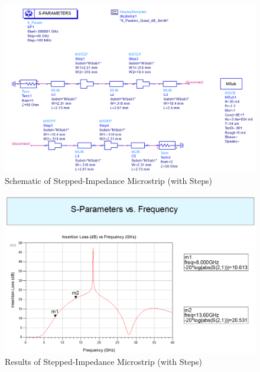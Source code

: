     \begin{figure}[H]
        \centering
        \includegraphics[width=0.8\linewidth]{img/Problem1/MicrostripSteppedImpedanceWithStepsSchematic.PNG}
        \caption{Schematic of Stepped-Impedance Microstrip (with Steps)}
        \label{fig:img/Problem1/MicrostripSteppedImpedanceWithStepsSchematic}
    \end{figure}

    \begin{figure}[H]
        \centering
        \includegraphics[width=0.8\linewidth]{img/Problem1/MicrostripSteppedImpedanceWithStepsResults.PNG}
        \caption{Results of Stepped-Impedance Microstrip (with Steps)}
        \label{fig:img/Problem1/MicrostripSteppedImpedanceWithStepsResults}
    \end{figure}
